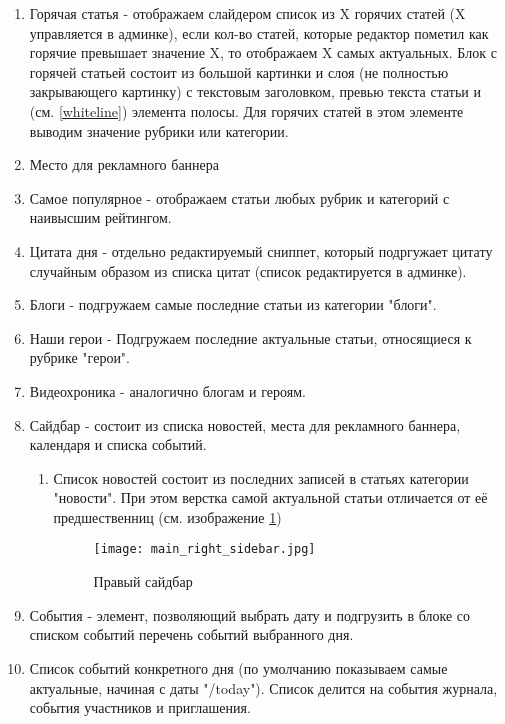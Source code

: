 \documentclass[12pt]{article} %
\begin{document}
\begin{enumerate}
    \item Горячая статья - отображаем слайдером список из X горячих статей (X управляется в админке), если кол-во статей, которые редактор пометил как горячие превышает значение X, то отображаем X самых актуальных. Блок с горячей статьей состоит из большой картинки и слоя (не полностью закрывающего картинку) с текстовым заголовком, превью текста статьи и (см. \ref{whiteline}) элемента полосы. Для горячих статей в этом элементе выводим значение рубрики или категории.
    \item Место для рекламного баннера
    \item Самое популярное - отображаем статьи любых рубрик и категорий с наивысшим рейтингом.
    \item Цитата дня - отдельно редактируемый сниппет, который подргужает цитату случайным образом из списка цитат (список редактируется в админке).
    \item Блоги - подгружаем  самые последние статьи из категории "блоги".
    \item Наши герои - Подгружаем последние актуальные статьи, относящиеся к рубрике "герои".
    \item Видеохроника - аналогично блогам и героям.
    \item Сайдбар - состоит из списка новостей, места для рекламного баннера, календаря и списка событий.
        \begin{enumerate}
            \item Список новостей состоит из последних записей в статьях категории "новости". При этом верстка самой актуальной статьи отличается от её предшественниц (см. изображение \ref{fig:main_right_sidebar.jpg})
            \begin{figure}[ht!]
            \centering
            \texttt{[image: main\_right\_sidebar.jpg]}
            \caption{Правый сайдбар \label{fig:main_right_sidebar.jpg}}
            \end{figure}
        \end{enumerate}
    \item События - элемент, позволяющий выбрать дату и подгрузить в блоке со списком событий перечень событий  выбранного дня.
    \item Список событий конкретного дня (по умолчанию показываем самые актуальные, начиная с даты "/today"). Список делится на события журнала, события участников и приглашения.

\end{enumerate}
\end{document}
